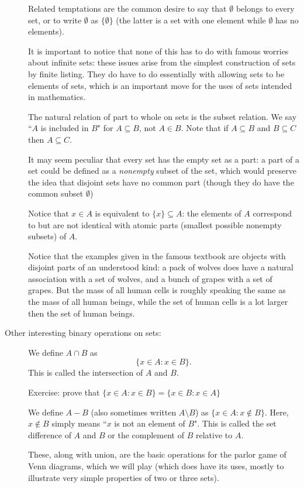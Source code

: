 \documentclass[12pt]{article}
\begin{document}
\begin{description}
Related temptations are the common desire to say that $\emptyset$ belongs to every set, or to write $\emptyset$
as $\{\emptyset\}$ (the latter is a set with one element while $\emptyset$ has no elements).

It is important to notice that none of this has to do with famous worries about infinite sets:  these issues arise from the simplest construction of sets by finite listing.  They do have to do essentially with allowing sets to be elements of sets, which is an important move for the uses of sets intended in mathematics.

The natural relation of part to whole on sets is the subset relation.  We say ``$A$ is included in $B$" for $A \subseteq B$, not $A \in B$.  Note that if $A \subseteq B$ and $B \subseteq C$ then $A \subseteq C$.

It may seem peculiar that every set has the empty set as a part:  a part of a set could be defined as a {\em nonempty\/} subset of the set, which would preserve the idea that disjoint sets have no common part (though they do have the common subset $\emptyset$)

Notice that $x \in A$ is equivalent to $\{x\} \subseteq A$:  the elements of $A$ correspond to but are not identical with atomic parts (smallest possible nonempty subsets) of $A$.

Notice that the examples given in the famous textbook are objects with disjoint parts of an understood kind:  a pack of wolves does have a natural association with a set of wolves, and a bunch of grapes with a set of grapes.   But the mass of all human cells is roughly speaking the same as the mass of all human beings, while the set of human cells is a lot larger then the set of human beings.




\item[Other interesting binary operations on sets:]

We define $A \cap B$ as $$\{x \in A:x \in B\}.$$  This is called the intersection of $A$ and $B$.

Exercise:  prove that $\{x \in A:x \in B\} = \{x \in B:x \in A\}$

We define $A - B$ (also sometimes written $A \setminus B$) as $\{x \in A:x \not\in B\}$.  Here, $x \not\in B$ simply means ``$x$ is not an element of $B$".
This is called the set difference of $A$ and $B$ or the complement of $B$ relative to $A$.

These, along with union, are the basic operations for the parlor game of Venn diagrams, which we will play (which does have its uses, mostly to illustrate very simple properties of two or three sets).


\end{description}
\end{document}
